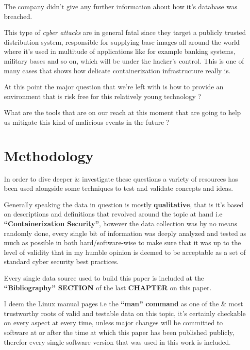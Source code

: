 \documentclass[
  14pt,
  english,
  a4paper,
]{scrreprt}
\begin{document}
The company didn't give any further information about how it's database
was breached.

This type of \emph{cyber attacks} are in general fatal since they target
a publicly trusted distribution system, responsible for supplying base
images all around the world where it's used in multitude of applications
like for example banking systems, military bases and so on, which will
be under the hacker's control. This is one of many cases that shows how
delicate containerization infrastructure really is.

At this point the major question that we're left with is how to provide
an environment that is risk free for this relatively young technology ?

What are the tools that are on our reach at this moment that are going
to help us mitigate this kind of malicious events in the future ?

\hypertarget{methodology}{%
\section{Methodology}\label{methodology}}

In order to dive deeper \& investigate these questions a variety of
resources has been used alongside some techniques to test and validate
concepts and ideas.

Generally speaking the data in question is mostly \textbf{qualitative},
that is it's based on descriptions and definitions that revolved around
the topic at hand i.e \textbf{``Containerization Security''}, however
the data collection was by no means randomly done, every single bit of
information was deeply analyzed and tested as much as possible in both
hard/software-wise to make sure that it was up to the level of validity
that in my humble opinion is deemed to be acceptable as a set of
standard cyber security best practices.

Every single data source used to build this paper is included at the
\textbf{``Bibliography'' SECTION} of the last \textbf{CHAPTER} on this
paper.

I deem the Linux manual pages i.e the \textbf{``man'' command} as one of
the \& most trustworthy roots of valid and testable data on this topic,
it's certainly checkable on every aspect at every time, unless major
changes will be committed to software at or after the time at which this
paper has been published publicly, therefor every single software
version that was used in this work is included.
\end{document}
